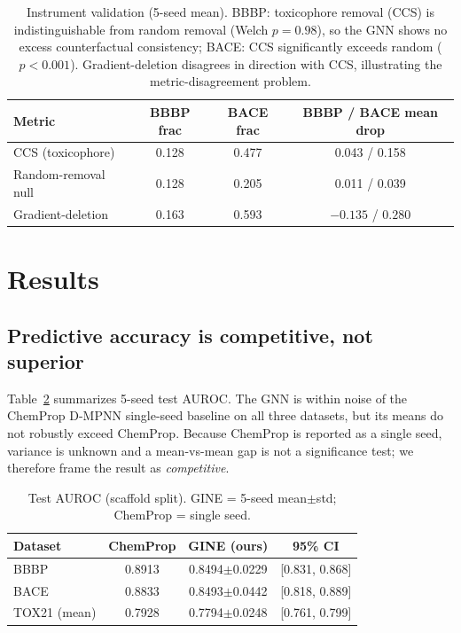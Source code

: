\documentclass[journal]{IEEEtran}
\newcommand{\BBBPauc}{0.8494}  \newcommand{\BBBPaucsd}{0.0229}
\newcommand{\BACEauc}{0.8493}  \newcommand{\BACEaucsd}{0.0442}
\newcommand{\TOXauc}{0.7794}   \newcommand{\TOXaucsd}{0.0248}
\newcommand{\ChemBBBP}{0.8913} \newcommand{\ChemBACE}{0.8833}
\newcommand{\ChemTOX}{0.7928}  \newcommand{\ChemClin}{0.8407/0.8600}
\begin{document}
\begin{table}[t]
\centering
\caption{Instrument validation (5-seed mean). BBBP: toxicophore removal (CCS) is
indistinguishable from random removal (Welch $p=0.98$), so the GNN shows no
excess counterfactual consistency; BACE: CCS significantly exceeds random
($p<0.001$). Gradient-deletion disagrees in direction with CCS, illustrating the
metric-disagreement problem.}
\label{tab:validate}
\begin{tabular}{lccc}
\toprule
Metric & BBBP frac & BACE frac & BBBP / BACE mean drop \\
\midrule
CCS (toxicophore) & 0.128 & 0.477 & 0.043 / 0.158 \\
Random-removal null & 0.128 & 0.205 & 0.011 / 0.039 \\
Gradient-deletion & 0.163 & 0.593 & $-0.135$ / $0.280$ \\
\bottomrule
\end{tabular}
\end{table}

\section{Results}
\subsection{Predictive accuracy is competitive, not superior}
Table~\ref{tab:auroc} summarizes 5-seed test AUROC. The GNN is within noise of the
ChemProp D-MPNN single-seed baseline on all three datasets, but its means do not
robustly exceed ChemProp. Because ChemProp is reported as a single seed, variance
is unknown and a mean-vs-mean gap is not a significance test; we therefore frame
the result as \emph{competitive}.

\begin{table}[t]
\centering
\caption{Test AUROC (scaffold split). GINE = 5-seed mean$\pm$std; ChemProp = single seed.}
\label{tab:auroc}
\begin{tabular}{lccc}
\toprule
Dataset & ChemProp & GINE (ours) & 95\% CI \\
\midrule
BBBP & \ChemBBBP & \BBBPauc$\pm$\BBBPaucsd & [0.831, 0.868] \\
BACE & \ChemBACE & \BACEauc$\pm$\BACEaucsd & [0.818, 0.889] \\
TOX21 (mean) & \ChemTOX & \TOXauc$\pm$\TOXaucsd & [0.761, 0.799] \\
\bottomrule
\end{tabular}
\end{table}
\end{document}
